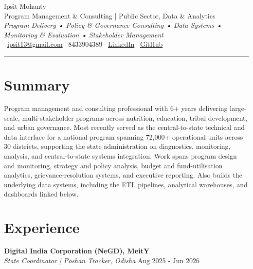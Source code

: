 \documentclass[a4paper,10pt]{article}
\begin{document}
\sloppy

\begin{center}
  {\Huge Ipsit Mohanty} \\[2mm]
  {\Large Program Management \& Consulting | Public Sector, Data \& Analytics} \\[1mm]
  {\small \textit{Program Delivery • Policy \& Governance Consulting • Data Systems • Monitoring \& Evaluation • Stakeholder Management}} \\[1.5mm]
  \faEnvelope~\href{mailto:ipsit13@gmail.com}{ipsit13@gmail.com} \quad
  \faPhone~8433904389 \quad
  \faLinkedin~\href{%%TRACKER_LI%%}{LinkedIn} \quad
  \faGithub~\href{%%TRACKER_GH%%}{GitHub}
\end{center}
\noindent\rule{\textwidth}{0.2pt}

\section*{Summary}
Program management and consulting professional with 6+ years delivering large-scale, multi-stakeholder programs across nutrition, education, tribal development, and urban governance. Most recently served as the central-to-state technical and data interface for a national program spanning 72,000+ operational units across 30 districts, supporting the state administration on diagnostics, monitoring, analysis, and central-to-state systems integration. Work spans program design and monitoring, strategy and policy analysis, budget and fund-utilisation analytics, grievance-resolution systems, and executive reporting. Also builds the underlying data systems, including the ETL pipelines, analytical warehouses, and dashboards linked below.

\section*{Experience}

{\large\textbf{Digital India Corporation (NeGD), MeitY}} \\
\textit{State Coordinator | Poshan Tracker, Odisha} \hfill {\datefont\small Aug 2025 - Jun 2026}
\end{document}
